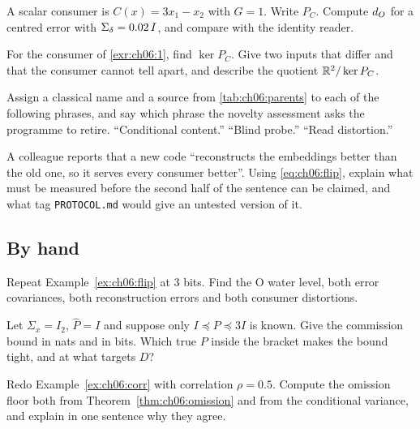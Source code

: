 \begin{exercise}\label{exr:ch06:1}
A scalar consumer is $C(x)=3x_1-x_2$ with $G=1$. Write $P_C$. Compute $d_O$ for a centred error with $\Sigma_\delta=0.02\,I$, and compare with the identity reader.
\end{exercise}

\begin{exercise}\label{exr:ch06:2}
For the consumer of \cref{exr:ch06:1}, find $\ker P_C$. Give two inputs that differ and that the consumer cannot tell apart, and describe the quotient $\mathbb{R}^2/\operatorname{ker} P_C$.
\end{exercise}

\begin{exercise}\label{exr:ch06:3}
Assign a classical name and a source from \cref{tab:ch06:parents} to each of the following phrases, and say which phrase the novelty assessment asks the programme to retire. ``Conditional content.'' ``Blind probe.'' ``Read distortion.''
\end{exercise}

\begin{exercise}\label{exr:ch06:4}
A colleague reports that a new code ``reconstructs the embeddings better than the old one, so it serves every consumer better''. Using \cref{eq:ch06:flip}, explain what must be measured before the second half of the sentence can be claimed, and what tag \texttt{PROTOCOL.md} would give an untested version of it.
\end{exercise}

\subsection*{By hand}

\begin{exercise}\label{exr:ch06:5}
Repeat Example~\ref{ex:ch06:flip} at $3$ bits. Find the O water level, both error covariances, both reconstruction errors and both consumer distortions.
\end{exercise}

\begin{exercise}\label{exr:ch06:6}
Let $\Sigma_x=I_2$, $\hat P=I$ and suppose only $I\preceq P\preceq 3I$ is known. Give the commission bound in nats and in bits. Which true $P$ inside the bracket makes the bound tight, and at what targets $D$?
\end{exercise}

\begin{exercise}\label{exr:ch06:7}
Redo Example~\ref{ex:ch06:corr} with correlation $\rho=0.5$. Compute the omission floor both from Theorem~\ref{thm:ch06:omission} and from the conditional variance, and explain in one sentence why they agree.
\end{exercise}

